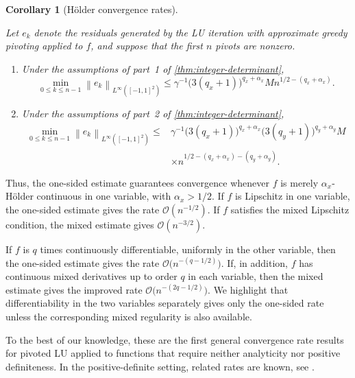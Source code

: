 \documentclass[11pt]{article}
\newtheorem{corollary}[corollary]{Corollary}
\theoremstyle{definition}
\theoremstyle{remark}
\newcommand{\norm}[1]{\left\lVert #1\right\rVert}
\begin{document}
\begin{corollary}[H\"older convergence rates]
\label{cor:functional-holder-rates}
 
Let $e_k$ denote the residuals generated by the LU iteration
with approximate greedy pivoting applied to $f$, and suppose that the first $n$
pivots are nonzero.

\begin{enumerate}
\item
Under the assumptions of part~1 of
\cref{thm:integer-determinant},
\[
    \min_{0\le k\le n-1}
    \norm{e_k}_{L^\infty([-1,1]^2)}
    \le
    \gamma^{-1}
    \bigl(3(q_x+1)\bigr)^{q_x+\alpha_x}
    M n^{1/2-(q_x+\alpha_x)}.
\]

\item
Under the assumptions of part~2 of
\cref{thm:integer-determinant},
\[
\begin{aligned}
    \min_{0\le k\le n-1}
    \norm{e_k}_{L^\infty([-1,1]^2)}
    \le{}&
    \gamma^{-1}
    \bigl(3(q_x+1)\bigr)^{q_x+\alpha_x}
    \bigl(3(q_y+1)\bigr)^{q_y+\alpha_y}
    M\\
    &\times
    n^{1/2-(q_x+\alpha_x)-(q_y+\alpha_y)}.
\end{aligned}
\]
\end{enumerate}
\end{corollary}

Thus, the one-sided estimate guarantees convergence whenever $f$ is merely $\alpha_x$-H\"older continuous in one variable, with
$\alpha_x>1/2$. If $f$ is Lipschitz in one variable, the one-sided
estimate gives the rate $\mathcal O(n^{-1/2})$. If $f$ satisfies the
mixed Lipschitz condition, the mixed estimate gives
$\mathcal O(n^{-3/2})$.

If $f$ is $q$ times continuously differentiable, uniformly in the other
variable, then the one-sided estimate gives the
rate
$
    \mathcal O\bigl(n^{-(q-1/2)}\bigr).
$
If, in addition, $f$ has continuous mixed derivatives up to order $q$ in
each variable, then the mixed estimate gives the improved rate
$
    \mathcal O\bigl(n^{-(2q-1/2)}\bigr).
$
We highlight that differentiability in the two variables separately gives only the
one-sided rate unless the corresponding mixed regularity is also
available.

To the best of our knowledge, these are the first general convergence
rate results for pivoted LU applied to functions that require neither
analyticity nor positive definiteness. In the positive-definite setting,
related rates are known,
see \cite{JeongTownsend2025,SantinHaasdonk2018}.
\end{document}
